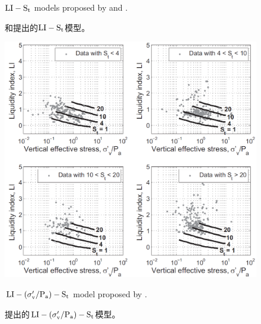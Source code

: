 \begin{figure}[!p]
\begin{minipage}[t]{0.48\textwidth}
        \caption{$\rm{LI}-S_t$ models proposed by \citet{Bjerrum195449} and \citet{Ching2012522}.}
        \vspace{-5pt}
        \addtocounter{figure}{-1}
        \renewcommand{\figurename}{图}
        \caption{\citet{Bjerrum195449}和\citet{Ching2012522}提出的$\rm{LI}-S_t$模型。}
        \label{figure:3}
        \renewcommand{\figurename}{Figure}
    \end{minipage}
\end{figure}

\begin{figure}[!p]
    \centering
    \begin{minipage}[t]{0.48\textwidth}
        \centering
        \includegraphics[width=\textwidth]{figures/figure-4.png}
        \caption{$\rm{LI}-(\sigma_v'/P_a)-S_t$ model proposed by \citet{Mitchell1993}.}
        \vspace{-5pt}
        \addtocounter{figure}{-1}
        \renewcommand{\figurename}{图}
        \caption{\citet{Mitchell1993}提出的$\rm{LI}-(\sigma_v'/P_a)-S_t$模型。}
        \label{figure:4}
        \renewcommand{\figurename}{Figure}
    \end{minipage}
    \begin{minipage}[t]{0.48\textwidth}
        \centering

\end{minipage}
\end{figure}
